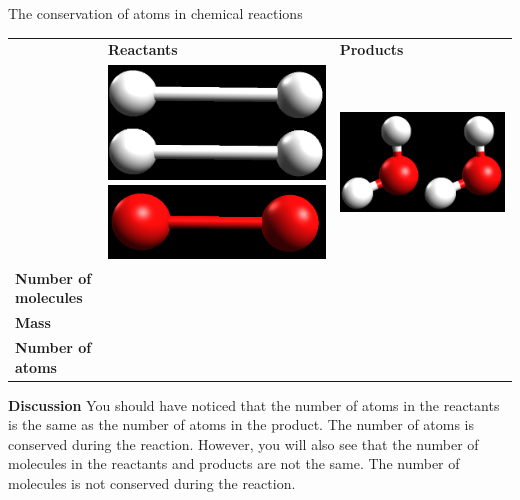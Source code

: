 \begin{activity}{The conservation of atoms in chemical reactions }
\begin{table}[H]
\begin{center}
\begin{tabular}{|l|l||l|}
& \textbf{Reactants} & \textbf{Products} \\ 
& \includegraphics[width=.1\textwidth]{photos/hydrogen.png} \includegraphics[width=.1\textwidth]{photos/oxygen.png} & \includegraphics[width=.1\textwidth]{photos/water.png} \\ \hline
   \textbf{Number of molecules} &  &  \\ \hline
\textbf{Mass} &  &  \\ \hline
\textbf{Number of atoms} &  &  \\ \hline
  \end{tabular}

 \end{center}

\end{table}

      \label{m38711*id65031}\noindent{}\textbf{Discussion}
     You should have noticed that the number of atoms in the reactants is the same as the number of atoms in the product. The number of atoms is conserved during the reaction. However, you will also see that the number of molecules in the reactants and products are not the same. The number of molecules is not conserved during the reaction.
 \par 
\end{activity}
\label{m38711*eip-14}

